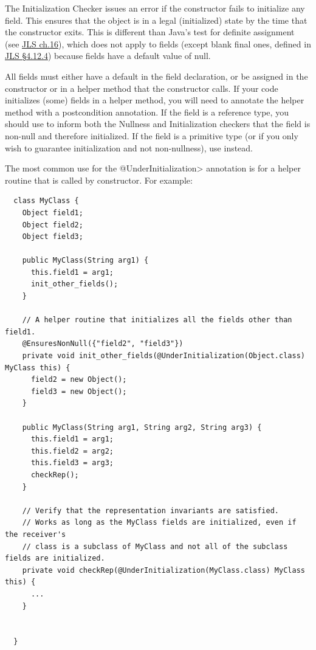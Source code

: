 The Initialization Checker issues an error if the constructor fails to initialize
any  field.  This ensures that the object is in a legal (initialized)
state by the time that the constructor exits.
This is different than Java's test for definite assignment (see
\href{https://docs.oracle.com/javase/specs/jls/se17/html/jls-16.html}{JLS ch.16}),
which does not apply to fields (except blank final ones, defined in
\href{https://docs.oracle.com/javase/specs/jls/se17/html/jls-4.html#jls-4.12.4}{JLS \S 4.12.4}) because fields
have a default value of null.


All  fields must either have a
default in the field declaration, or be assigned in the constructor or in a
helper method that the constructor calls.  If
your code initializes (some) fields in a helper method, you will need to
annotate the helper method with a postcondition annotation.
If the field is a reference type, you should use
to inform both the Nullness and Initialization checkers that the field is non-null and therefore initialized.
If the field is a primitive type (or if you only wish to guarantee initialization and not non-nullness), use
instead.


The most common use for the \<@UnderInitialization> annotation is for a
helper routine that is called by constructor.  For example:

\begin{Verbatim}
  class MyClass {
    Object field1;
    Object field2;
    Object field3;

    public MyClass(String arg1) {
      this.field1 = arg1;
      init_other_fields();
    }

    // A helper routine that initializes all the fields other than field1.
    @EnsuresNonNull({"field2", "field3"})
    private void init_other_fields(@UnderInitialization(Object.class) MyClass this) {
      field2 = new Object();
      field3 = new Object();
    }

    public MyClass(String arg1, String arg2, String arg3) {
      this.field1 = arg1;
      this.field2 = arg2;
      this.field3 = arg3;
      checkRep();
    }

    // Verify that the representation invariants are satisfied.
    // Works as long as the MyClass fields are initialized, even if the receiver's
    // class is a subclass of MyClass and not all of the subclass fields are initialized.
    private void checkRep(@UnderInitialization(MyClass.class) MyClass this) {
      ...
    }


  }
\end{Verbatim}

